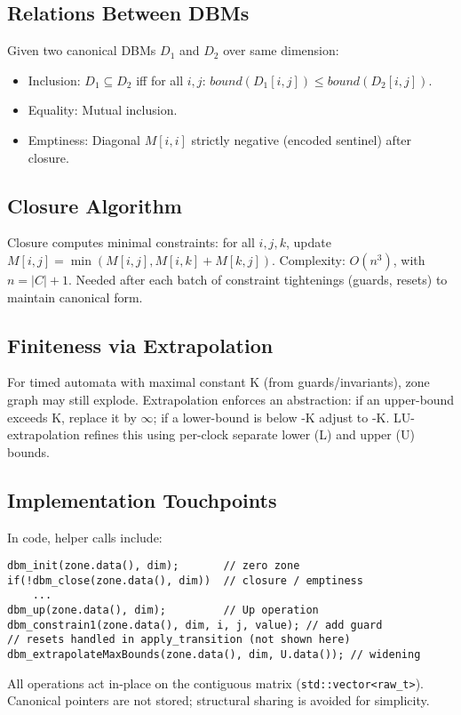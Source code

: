 \subsection{Relations Between DBMs}
Given two canonical DBMs \(D_1\) and \(D_2\) over same dimension:
\begin{itemize}
  \item Inclusion: \(D_1 \subseteq D_2\) iff for all \(i,j\): \(bound(D_1[i,j]) \le bound(D_2[i,j])\).
  \item Equality: Mutual inclusion.
  \item Emptiness: Diagonal \(M[i,i]\) strictly negative (encoded sentinel) after closure.
\end{itemize}

\subsection{Closure Algorithm}
Closure computes minimal constraints: for all \(i,j,k\), update \(M[i,j] = \min(M[i,j], M[i,k] + M[k,j])\). Complexity: \(O(n^3)\), with \(n = |C|+1\). Needed after each batch of constraint tightenings (guards, resets) to maintain canonical form.

\subsection{Finiteness via Extrapolation}
For timed automata with maximal constant K (from guards/invariants), zone graph may still explode. Extrapolation enforces an abstraction: if an upper-bound exceeds K, replace it by \(\infty\); if a lower-bound is below -K adjust to -K. LU-extrapolation refines this using per-clock separate lower (L) and upper (U) bounds.

\subsection{Implementation Touchpoints}
In code, helper calls include:
\begin{lstlisting}
dbm_init(zone.data(), dim);       // zero zone
if(!dbm_close(zone.data(), dim))  // closure / emptiness
    ...
dbm_up(zone.data(), dim);         // Up operation
dbm_constrain1(zone.data(), dim, i, j, value); // add guard
// resets handled in apply_transition (not shown here)
dbm_extrapolateMaxBounds(zone.data(), dim, U.data()); // widening
\end{lstlisting}
All operations act in-place on the contiguous matrix (\texttt{std::vector\textless raw\_t\textgreater}). Canonical pointers are not stored; structural sharing is avoided for simplicity.

